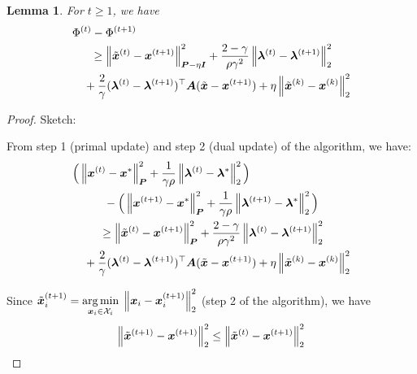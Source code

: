 \documentclass[twocolumn,amsthm]{autart}%
\theoremstyle{definition}
\theoremstyle{plain}
\newtheorem{theorem}{Theorem}
\newtheorem{lemma}{Lemma}
\begin{document}
\begin{lemma}
For $t \ge 1$, we have
\begin{equation}
\begin{multlined}
\Phi^{(t)} - \Phi^{(t+1)}  \\
\ge \norm{\xtil^{(t)}-\bbsym{x}^{(t+1)}}_{\bbsym{P}-\eta \bbsym{I}}^2
+ \frac{2-\gamma}{\rho \gamma^2} \norm{\bbsym{\lambda}^{(t)}-\bbsym{\lambda}^{(t+1)}}_2^2 \\
+ \frac{2}{\gamma} (\bbsym{\lambda}^{(t)}-\bbsym{\lambda}^{(t+1)})^\top \bbsym{A} (\xtil-\bbsym{x}^{(t+1)})
+ \eta \norm{\xtil^{(k)}-\bbsym{x}^{(k)}}_2^2
\end{multlined}
\end{equation}
\end{lemma}

\begin{proof}
Sketch:

From step 1 (primal update) and step 2 (dual update) of the algorithm, we have:
\begin{equation}
\begin{multlined}
\Big( \norm{\bbsym{x}^{(t)}-\bbsym{x}^{*}}^2_{\bbsym{P}}
+ \frac{1}{\gamma \rho} \norm{\bbsym{\lambda}^{(t)}-\bbsym{\lambda}^{*}}_2^2 \Big) \\
- \Big(  \norm{\bbsym{x}^{(t+1)}-\bbsym{x}^{*}}^2_{\bbsym{P}}
+ \frac{1}{\gamma \rho} \norm{\bbsym{\lambda}^{(t+1)}-\bbsym{\lambda}^{*}}_2^2 \Big) \\
\ge \norm{\xtil^{(t)}-\bbsym{x}^{(t+1)}}_{\bbsym{P}}^2
+ \frac{2-\gamma}{\rho \gamma^2} \norm{\bbsym{\lambda}^{(t)}-\bbsym{\lambda}^{(t+1)}}_2^2 \\
+ \frac{2}{\gamma} (\bbsym{\lambda}^{(t)}-\bbsym{\lambda}^{(t+1)})^\top \bbsym{A} (\xtil-\bbsym{x}^{(t+1)})
+ \eta \norm{\xtil^{(k)}-\bbsym{x}^{(k)}}_2^2
\end{multlined}
\end{equation}

Since $\Tilde{\boldsymbol{x}}_i^{(t+1)} = \underset{\boldsymbol{x}_i \in \mathcal{X}_i}{\operatorname*{arg\,min}} \;\left\lVert \boldsymbol{x}_i - \boldsymbol{x}_i^{(t+1)} \right\rVert_2^2$ (step 2 of the algorithm), we have
\begin{equation}
\left\lVert \Tilde{\boldsymbol{x}}^{(t+1)} - \boldsymbol{x}^{(t+1)} \right\rVert_2^2 
\le \left\lVert \Tilde{\boldsymbol{x}}^{(t)} - \boldsymbol{x}^{(t+1)} \right\rVert_2^2 
\end{equation}
\end{proof}
\end{document}
